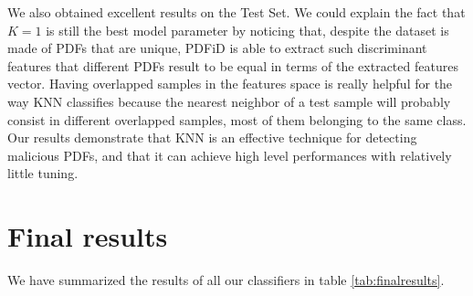 \documentclass[twocolumn, switch]{article} %
\begin{document}
We also obtained excellent results on the Test Set. We could explain the fact that $K=1$ is still the best model parameter by noticing that, despite the dataset is made of PDFs that are unique, PDFiD is able to extract such discriminant features that different PDFs result to be equal in terms of the extracted features vector. Having overlapped samples in the features space is really helpful for the way KNN classifies because the nearest neighbor of a test sample will probably consist in different overlapped samples, most of them belonging to the same class.
Our results demonstrate that KNN is an effective technique for detecting malicious PDFs, and that it can achieve high level performances with relatively little tuning.

\section{Final results}
\label{sec:finalresults}
We have summarized the results of all our classifiers in table \ref{tab:finalresults}.
\end{document}
